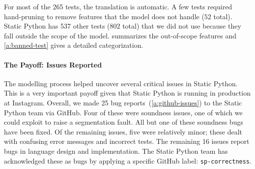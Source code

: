 \documentclass[english,cleveref,submission]{programming}
\newcommand{\SP}{Static Python}
\newcommand{\totalnum}[1]{$#1$ total}
\newcommand{\numSPtest}{265}
\newcommand{\numSPtotal}{802} %
\newcommand{\numSPdiff}{537} %
\begin{document}
For most of the \numSPtest{} tests, the translation is automatic.
A few tests required hand-pruning to remove features that the model does not
handle (\totalnum{52}).
\SP{} has \numSPdiff{} other tests (\totalnum{\numSPtotal{}}) that we did not
use because they fall outside the scope of the model.
 summarizes the out-of-scope features and \cref{a:banned-test} gives
a detailed categorization.



\paragraph{The Payoff: Issues Reported}


The modelling process helped uncover several critical issues in \SP{}.
This is a very important payoff given that \SP{} is running in production at
Instagram.
Overall, we made 25 bug reports~(\cref{a:github-issues}) to the \SP{} team via GitHub.
Four of these were soundness issues, one of which we could exploit to raise
a segmentation fault.
All but one of these soundness bugs have been fixed.
Of the remaining issues, five were relatively minor; these dealt with confusing error messages
and incorrect tests.
The remaining 16 issues report bugs in language design and implementation.
The \SP{} team has acknowledged these as bugs by applying a specific GitHub label: \lstinline{sp-correctness}.
\end{document}
